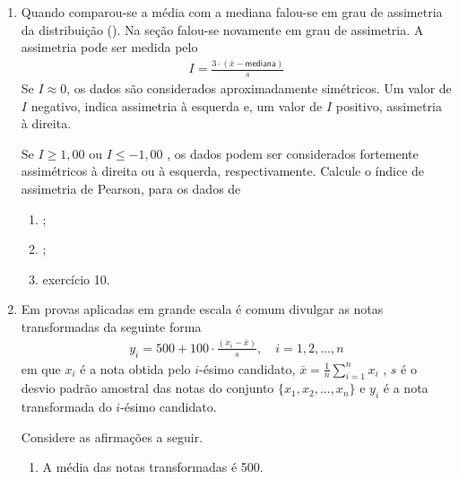 \begin{enumerate}
\item Quando comparou-se a média com a mediana falou-se em grau de assimetria da distribuição ({\hyperref[\detokenize{PE104-1:sec-organizando1}]{}}). Na seção {\hyperref[\detokenize{PE104-A:sec-para-saber-mais}]{}} falou-se novamente em grau de assimetria. A assimetria pode ser medida pelo 
\begin{equation*}
\begin{split}I=\frac{3\cdot(\bar{x}-\textsf{mediana})}{s}\end{split}
\end{equation*}
Se \(I\approx 0\), os dados são considerados aproximadamente simétricos. Um valor de \(I\) negativo, indica assimetria à esquerda e, um valor de \(I\) positivo, assimetria à direita.

Se \(I\geq 1,00\) ou \(I\leq -1,00\) , os dados podem ser considerados fortemente assimétricos à direita ou à esquerda, respectivamente. Calcule o índice de assimetria de Pearson, para os dados de
\begin{enumerate}
\item {} 
;

\item {} 
{\hyperref[\detokenize{PE104-7:ativ-comparacaodegruposusandoboxplot}]{}};

\item {} 
exercício 10.

\end{enumerate}

\item Em provas aplicadas em grande escala é comum divulgar as notas transformadas da seguinte forma
\begin{equation*}
\begin{split}y_i = 500+100\cdot \frac{(x_i-\bar{x})}{s}, \quad i=1,2,...,n\end{split}
\end{equation*}
em que \(x_i\) é a nota obtida pelo \(i\)-ésimo candidato, \(\bar{x}=\frac{1}{n}\displaystyle{\sum^n_{i=1}}x_i\) , \(s\) é o desvio padrão amostral das notas do conjunto \(\{ x_1,x_2, ..., x_n\}\) e \(y_i\) é a nota transformada do \(i\)-ésimo candidato.

Considere as afirmações a seguir.
\begin{enumerate}
\item {} 
A média das notas transformadas é 500.


\end{enumerate}
\end{enumerate}
